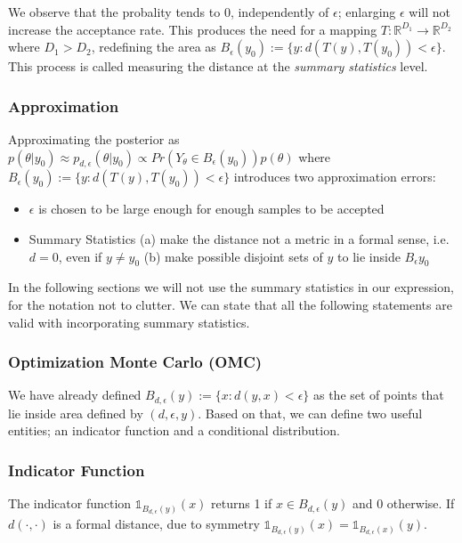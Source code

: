 \documentclass[11pt,twoside]{article}
\numberwithin{Theorem}{section}
\numberwithin{Definition}{section}
\numberwithin{Lemma}{section}
\numberwithin{Algorithm}{section}
\numberwithin{equation}{section}
\begin{document}
We observe that the probality tends to $0$, independently of $\epsilon$; enlarging $\epsilon$ will not increase the acceptance rate. This produces the need for a mapping $T: \mathbb{R}^{D_1} \rightarrow \mathbb{R}^{D_2}$ where $D_1 > D_2$, redefining the area as $B_\epsilon(y_0) := \{y: d(T(y), T(y_0)) < \epsilon \}$. This process is called measuring the distance at the \textit{summary statistics} level.

\subsubsection{Approximation}

Approximating the posterior as $p(\theta|y_0) \approx p_{d,\epsilon}(\theta|y_0) \propto Pr(Y_\theta \in B_\epsilon(y_0))p(\theta)$ where $B_\epsilon(y_0) := \{y: d(T(y), T(y_0)) < \epsilon \}$ introduces two approximation errors:

\begin{itemize}
\item $\epsilon$ is chosen to be large enough for enough samples to be accepted
  \item Summary Statistics (a) make the distance not a metric in a formal sense, i.e. $d = 0$, even if $y \neq y_0$ (b) make possible disjoint sets of $y$ to lie inside $B_\epsilon{y_0}$
  \end{itemize}

  In the following sections we will not use the summary statistics in our expression, for the notation not to clutter. We can state that all the following statements are valid with incorporating summary statistics.
  
  \subsubsection{Optimization Monte Carlo (OMC)}

  We have already defined $B_{d,\epsilon}(y) := \{x: d(y,x)<\epsilon\}$ as the set of points that lie inside area defined by $(d, \epsilon, y)$. Based on that, we can define two useful entities; an indicator function and a conditional distribution.

  \subsubsection*{Indicator Function}

The indicator function $\mathbb{1}_{B_{d,\epsilon}(y)}(x)$ returns 1 if $x \in B_{d,\epsilon}(y)$ and 0 otherwise. If $d(\cdot,\cdot)$ is a formal distance, due to symmetry $\mathbb{1}_{B_{d,\epsilon}(y)}(x) = \mathbb{1}_{B_{d,\epsilon}(x)}(y)$.
\end{document}
